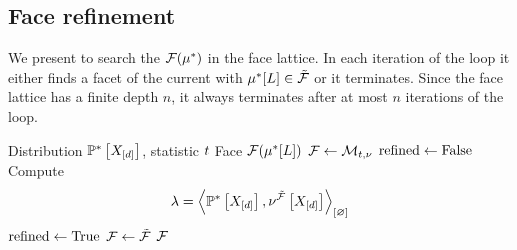 \subsection{Face refinement}

We present  to search the $\mathcal{F}(\mu^*)$ in the face lattice.
In each iteration of the \whileSymbol{} loop it either finds a facet of the current with $\mu^*[L]\in\tilde{\mathcal{F}}$ or it terminates.
Since the face lattice has a finite depth $n$, it always terminates after at most $n$ iterations of the \whileSymbol{} loop.


\begin{algorithm}[hbt!]
    \caption{Face refinement}\label{alg:faceRefinement}
    \begin{algorithmic}
        \Require Distribution $\mathbb{P}^*\left[X_{[d]}\right]$, statistic $t$
        \Ensure Face $\mathcal{F}(\mu^*[L])$
        \iosepline
        \State $\mathcal{F}\leftarrow\mathcal{M}_{t,\nu}$
            \State $\mathrm{refined}\leftarrow \mathrm{False}$
                    \State Compute
                    \begin{align*}
                        \lambda=\left\langle \mathbb{P}^*\left[X_{[d]}\right],\nu^{\tilde{\mathcal{F}}}\left[X_{[d]}\right]\right\rangle_{\left[ \varnothing \right]}
                    \end{align*}
                        \State $\mathrm{refined}\leftarrow \mathrm{True}$
                        \State $\mathcal{F}\leftarrow\tilde{\mathcal{F}}$
                    \EndIf
                \EndIf
            \EndFor
                \State \Return $\mathcal{F}$
            \EndIf
        \EndWhile
    \end{algorithmic}
\end{algorithm}